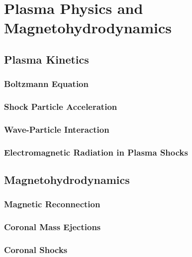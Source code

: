 

\chapter{Plasma Physics and Magnetohydrodynamics} 
\label{chap:2}


\section{Plasma Kinetics}\label{sec:2}

\subsection{Boltzmann Equation}\label{sec:20}

\subsection{Shock Particle Acceleration}\label{sec:21}

\subsection{Wave-Particle Interaction}\label{sec:22}

\subsection{Electromagnetic Radiation in Plasma Shocks}\label{sec:23}


\section{Magnetohydrodynamics}\label{sec:1}

\subsection{Magnetic Reconnection}\label{sec:10}

\subsection{Coronal Mass Ejections}\label{sec:11}

\subsection{Coronal Shocks}\label{sec:12}




